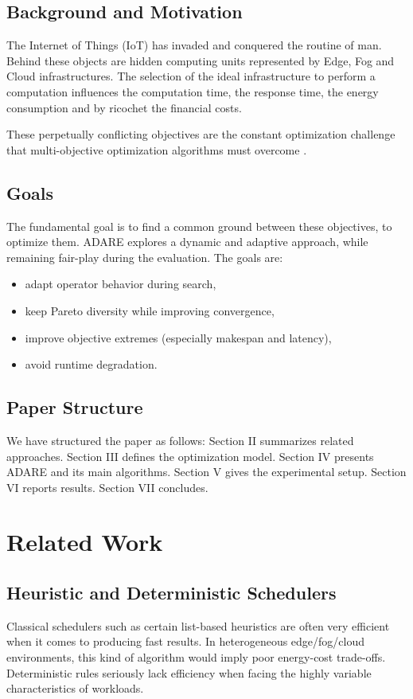 \documentclass[conference]{IEEEtran}
\begin{document}
\subsection{Background and Motivation}
The Internet of Things (IoT) has invaded and conquered the routine of man. Behind these objects are hidden computing units represented by Edge, Fog and Cloud infrastructures. The selection of the ideal infrastructure to perform a computation influences the computation time, the response time, the energy consumption and by ricochet the financial costs.

These perpetually conflicting objectives are the constant optimization challenge that multi-objective optimization algorithms must overcome \cite{deb2014,deb2014nsga3}.

\subsection{Goals}
The fundamental goal is to find a common ground between these objectives, to optimize them. ADARE explores a dynamic and adaptive approach, while remaining fair-play during the evaluation. The goals are:
\begin{itemize}
    \item adapt operator behavior during search,
    \item keep Pareto diversity while improving convergence,
    \item improve objective extremes (especially makespan and latency),
    \item avoid runtime degradation.
\end{itemize}

\subsection{Paper Structure}
We have structured the paper as follows: Section II summarizes related approaches. Section III defines the optimization model. Section IV presents ADARE and its main algorithms. Section V gives the experimental setup. Section VI reports results. Section VII concludes.

\section{Related Work}
\subsection{Heuristic and Deterministic Schedulers}
Classical schedulers such as certain list-based heuristics are often very efficient when it comes to producing fast results. In heterogeneous edge/fog/cloud environments, this kind of algorithm would imply poor energy-cost trade-offs. Deterministic rules seriously lack efficiency when facing the highly variable characteristics of workloads.
\end{document}
